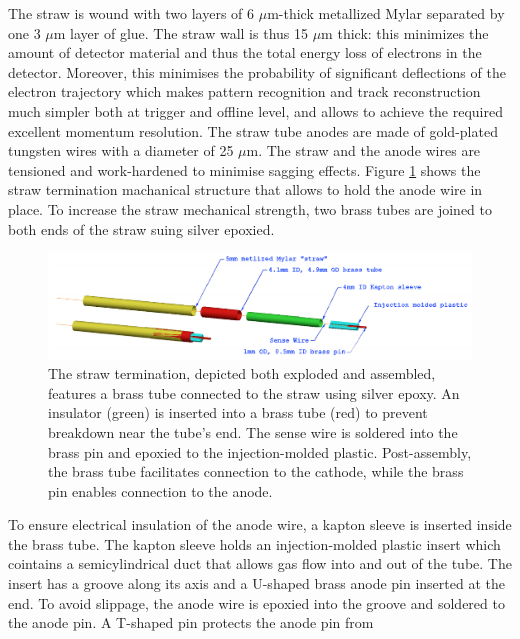 The straw is wound with two layers of 6 $\mu$m-thick metallized 
Mylar separated by one 3 $\mu$m layer of glue. The straw wall is thus 15 $\mu$m thick: 
this minimizes the amount of detector material and thus the total energy 
loss of electrons in the detector. Moreover, this minimises the probability 
of significant deflections of the electron trajectory which makes pattern 
recognition and track reconstruction much simpler both at trigger 
and offline level, and allows to achieve the required excellent momentum 
resolution. The straw tube anodes are made of gold-plated tungsten wires with 
a diameter of 25 $\mu$m. The straw and the anode wires are tensioned 
and work-hardened to minimise sagging effects.
Figure \ref{fig:trktubessmon} shows the straw termination machanical 
structure that allows to hold the anode wire in place.
To increase the straw mechanical strength, two brass tubes 
are joined to both ends of the straw suing silver epoxied.
    \begin{figure}[!h]
        \centering
        \includegraphics[width =\textwidth]{figures/png/Screenshot_20240706_153158.png}
        \caption{The straw termination, depicted both exploded and assembled, 
        features a brass tube connected to the straw using silver epoxy. 
        An insulator (green) is inserted into a brass tube 
        (red) to prevent breakdown near the tube's end. The sense 
        wire is soldered into the brass pin and epoxied to the 
        injection-molded plastic. Post-assembly, the brass tube 
        facilitates connection to the cathode, while the brass pin 
        enables connection to the anode.}
        \label{fig:trktubessmon}
        \end{figure}
        To ensure electrical insulation of the anode wire, 
        a kapton sleeve is inserted inside the brass tube. 
        The kapton sleeve holds an injection-molded plastic 
        insert which cointains a semicylindrical duct that 
        allows gas flow into and out of the tube. The insert 
        has a groove along its axis and a U-shaped brass anode 
        pin inserted at the end. To avoid slippage, the anode 
        wire is epoxied into the groove and soldered to the 
        anode pin. A T-shaped pin protects the anode pin from 
